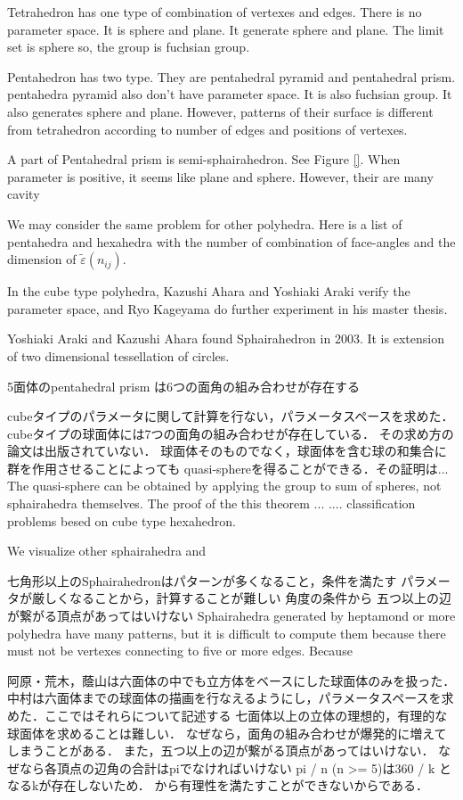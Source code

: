 \documentclass[dvipdfmx]{interact}
\theoremstyle{plain}%
\theoremstyle{definition}
\theoremstyle{remark}
\theoremstyle{problemstyle}
\begin{document}
Tetrahedron has one type of combination of vertexes and edges.
There is no parameter space.
It is sphere and plane.
It generate sphere and plane. The limit set is sphere so, the group is
fuchsian group.

Pentahedron has two type. They are pentahedral pyramid and pentahedral prism.
pentahedra pyramid also don't have parameter space.
It is also fuchsian group.
It also generates sphere and plane. However, patterns of their surface is
different from tetrahedron according to number of edges and positions of
vertexes.

A part of Pentahedral prism is semi-sphairahedron.
See Figure \ref{}. When parameter is positive, it seems like plane and
sphere. However, their are many cavity

We may consider the same problem for other polyhedra. Here is a list of
pentahedra and hexahedra with the number of combination of face-angles
and the dimension of $\tilde{\varepsilon}(n_{ij})$.

In the cube type polyhedra, Kazushi Ahara and Yoshiaki Araki
verify the parameter space, and Ryo Kageyama do further experiment in
his master thesis\cite{kageyama}. 

Yoshiaki Araki and Kazushi Ahara found Sphairahedron in 2003.
It is extension of two dimensional tessellation of circles.

5面体のpentahedral prism は6つの面角の組み合わせが存在する

cubeタイプのパラメータに関して計算を行ない，パラメータスペースを求めた．
cubeタイプの球面体には7つの面角の組み合わせが存在している．
その求め方の論文は出版されていない．
球面体そのものでなく，球面体を含む球の和集合に群を作用させることによっても
quasi-sphereを得ることができる．その証明は...
The quasi-sphere can be obtained by applying the group to sum of
spheres, not sphairahedra themselves.
The proof of the this theorem ... ....
classification problems besed on cube type hexahedron.

We visualize other sphairahedra and 

七角形以上のSphairahedronはパターンが多くなること，条件を満たす
パラメータが厳しくなることから，計算することが難しい
角度の条件から
五つ以上の辺が繋がる頂点があってはいけない
Sphairahedra generated by heptamond or more polyhedra have many
patterns, but it is difficult to compute them 
because there must not be vertexes connecting to five or more edges.
Because 

阿原・荒木，蔭山は六面体の中でも立方体をベースにした球面体のみを扱った．
中村は六面体までの球面体の描画を行なえるようにし，パラメータスペースを求
めた．ここではそれらについて記述する
七面体以上の立体の理想的，有理的な球面体を求めることは難しい．
なぜなら，面角の組み合わせが爆発的に増えてしまうことがある．
また，五つ以上の辺が繋がる頂点があってはいけない．
なぜなら各頂点の辺角の合計はpiでなければいけない
pi / n (n >= 5)は360 / k となるkが存在しないため．
から有理性を満たすことができないからである．
\end{document}
